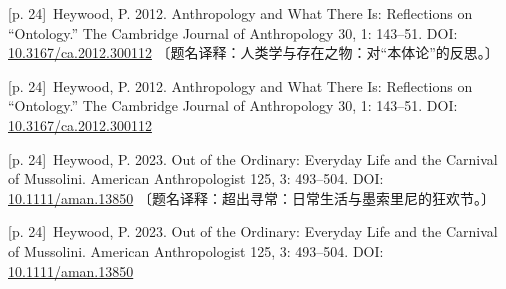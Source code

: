 \documentclass[10pt,a4paper]{article}
\begin{document}
\noindent\begin{minipage}{\textwidth}\begin{minipage}[t]{\dimexpr.5\textwidth-4mm\relax}\noindent\begin{minipage}[t]{\linewidth}{\scriptsize\color{gray} [p. 24]}\ Heywood, P. 2012. Anthropology and What There Is: Reflections on “Ontology.” The Cambridge Journal of Anthropology 30, 1: 143–51. DOI: \url{10.3167/ca.2012.300112} 〔题名译释：人类学与存在之物：对“本体论”的反思。〕\par\end{minipage}\par\end{minipage}\hfill\begin{minipage}[t]{\dimexpr.5\textwidth-4mm\relax}\noindent\begin{minipage}[t]{\linewidth}{\scriptsize\color{gray} [p. 24]}\ Heywood, P. 2012. Anthropology and What There Is: Reflections on “Ontology.” The Cambridge Journal of Anthropology 30, 1: 143–51. DOI: \url{10.3167/ca.2012.300112}\par\end{minipage}\par\end{minipage}\end{minipage}\par
\noindent\begin{minipage}{\textwidth}\begin{minipage}[t]{\dimexpr.5\textwidth-4mm\relax}\noindent\begin{minipage}[t]{\linewidth}{\scriptsize\color{gray} [p. 24]}\ Heywood, P. 2023. Out of the Ordinary: Everyday Life and the Carnival of Mussolini. American Anthropologist 125, 3: 493–504. DOI: \url{10.1111/aman.13850} 〔题名译释：超出寻常：日常生活与墨索里尼的狂欢节。〕\par\end{minipage}\par\end{minipage}\hfill\begin{minipage}[t]{\dimexpr.5\textwidth-4mm\relax}\noindent\begin{minipage}[t]{\linewidth}{\scriptsize\color{gray} [p. 24]}\ Heywood, P. 2023. Out of the Ordinary: Everyday Life and the Carnival of Mussolini. American Anthropologist 125, 3: 493–504. DOI: \url{10.1111/aman.13850}\par\end{minipage}\par\end{minipage}\end{minipage}\par
\end{document}
